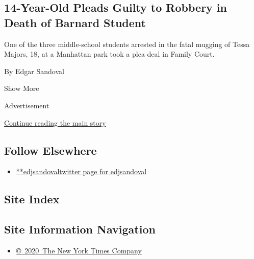 \begin{enumerate}
  \hypertarget{14-year-old-pleads-guilty-to-robbery-in-death-of-barnard-student}{%
  \subsection{14-Year-Old Pleads Guilty to Robbery in Death of Barnard
  Student}\label{14-year-old-pleads-guilty-to-robbery-in-death-of-barnard-student}}

  One of the three middle-school students arrested in the fatal mugging
  of Tessa Majors, 18, at a Manhattan park took a plea deal in Family
  Court.

  By Edgar Sandoval
\end{enumerate}

Show More

Advertisement

\protect\hyperlink{after-mid2}{Continue reading the main story}

\hypertarget{follow-elsewhere}{%
\subsection{Follow Elsewhere}\label{follow-elsewhere}}

\begin{itemize}
\tightlist
\item
  \href{https://twitter.com/edjsandoval}{**edjsandovaltwitter page for
  edjsandoval}
\end{itemize}

\hypertarget{site-index}{%
\subsection{Site Index}\label{site-index}}

\hypertarget{site-information-navigation}{%
\subsection{Site Information
Navigation}\label{site-information-navigation}}

\begin{itemize}
\tightlist
\item
  \href{https://help.nytimes3xbfgragh.onion/hc/en-us/articles/115014792127-Copyright-notice}{©~2020~The
  New York Times Company}
\end{itemize}

